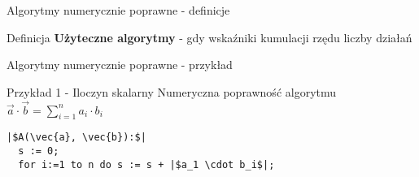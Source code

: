 \begin{frame}{Algorytmy numerycznie poprawne - definicje}
	\begin{block}{Definicja}
		{\bf Użyteczne algorytmy} - gdy wskaźniki kumulacji rzędu liczby działań
	\end{block}
\end{frame}
\begin{frame}[fragile]{Algorytmy numerycznie poprawne - przykład}
	\begin{exampleblock}{Przykład 1 - Iloczyn skalarny}
		Numeryczna poprawność algorytmu $\vec{a} \cdot \vec{b} = \sum_{i=1}^{n} a_i \cdot b_i$
        
\begin{lstlisting}[escapechar=|]
  |$A(\vec{a}, \vec{b}):$|
  s := 0;
  for i:=1 to n do s := s + |$a_1 \cdot b_i$|;
\end{lstlisting}
	\end{exampleblock}
\end{frame}
